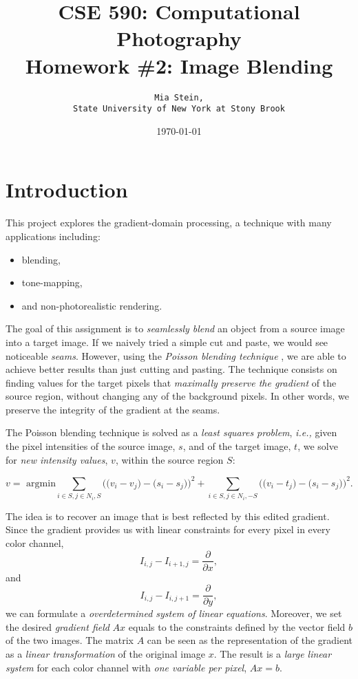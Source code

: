 \documentclass[11pt]{article}
\title{CSE 590: Computational Photography\\  Homework \#2: Image Blending }
\author{ \texttt{ Mia Stein,  }\\
	   \texttt{State University of New York at Stony Brook}}
\date{\today}
\newcommand{\ie}{{\it i.e., }}
\begin{document}
\maketitle
{}  




\section{Introduction}

This project explores the gradient-domain processing, a technique with many applications including:
\begin{itemize}
\item blending, 
\item tone-mapping, 
\item and non-photorealistic rendering.
\end{itemize}  

\quad

The  goal of this assignment is to {\it seamlessly blend} an object  from a source image into a target image. If we naively tried a simple cut and paste, we would see noticeable {\it seams}.  However, using the {\it Poisson blending technique} \cite{pois}, we are able  to achieve better results than just cutting and pasting.  The technique consists on finding values for the target pixels that {\it maximally preserve the gradient} of the source region, without changing any of the background pixels. In other words, we preserve the integrity of the gradient at the seams.

\quad 

The Poisson blending technique is solved as a {\it least squares problem}, \ie given the pixel intensities of the source image, $s$, and of the target image, $t$, we  solve for {\it new intensity values},  $v$, within the source region $S$:

\begin{equation}
v = \mbox{ argmin} \sum_{i \in S, j \in N_i, S} \Bigg ( \Big ( v_i -v_j\Big) - \Big (s_i - s_j \Big) \Bigg)^2 +  \sum_{i \in S, j \in N_i, -S} \Bigg ( \Big ( v_i -t_j\Big) - \Big (s_i - s_j \Big) \Bigg)^2. 
\label{aa}
\end{equation}

\quad

The idea is to recover an image that is best reflected by this edited gradient. Since the gradient provides us with linear constraints for every pixel in every color channel,
$$I_{i,j} - I_{i+1,j} = \frac{\partial}{\partial x},$$
and
$$I_{i,j} - I_{i,j+1} = \frac{\partial}{\partial y},$$
 we can formulate a {\it overdetermined system of linear equations}. Moreover, we set the desired {\it gradient field} $A x$ equals to the constraints defined by the vector field $b$ of the two images. The matrix $A$ can be seen as the representation of the gradient as a  {\it linear transformation} of the original image $x$. The result is a {\it large linear system} for each color channel with {\it one variable per pixel}, $Ax=b$. 
\end{document}
